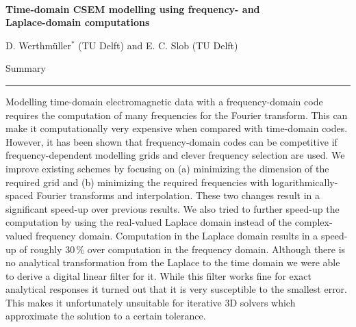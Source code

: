 \documentclass{eage2020}
\begin{document}
~\vspace{.5cm}

{\bf \sffamily \LARGE
  Time-domain CSEM modelling using frequency- and\\ Laplace-domain computations
}

\vspace{.5cm}

D. Werthmüller$^*$ (TU Delft) and E. C. Slob (TU Delft)

\vspace{1cm}

{\sffamily \LARGE Summary}
\hrule

Modelling time-domain electromagnetic data with a frequency-domain code
requires the computation of many frequencies for the Fourier transform. This
can make it computationally very expensive when compared with time-domain
codes. However, it has been shown that frequency-domain codes can be
competitive if frequency-dependent modelling grids and clever frequency
selection are used. We improve existing schemes by focusing on (a) minimizing
the dimension of the required grid and (b) minimizing the required frequencies
with logarithmically-spaced Fourier transforms and interpolation. These two
changes result in a significant speed-up over previous results. We also tried
to further speed-up the computation by using the real-valued Laplace domain
instead of the complex-valued frequency domain. Computation in the Laplace
domain results in a speed-up of roughly 30\,\% over computation in the
frequency domain. Although there is no analytical transformation from the
Laplace to the time domain we were able to derive a digital linear filter for
it. While this filter works fine for exact analytical responses it turned out
that it is very susceptible to the smallest error. This makes it unfortunately
unsuitable for iterative 3D solvers which approximate the solution to a certain
tolerance.
\end{document}
